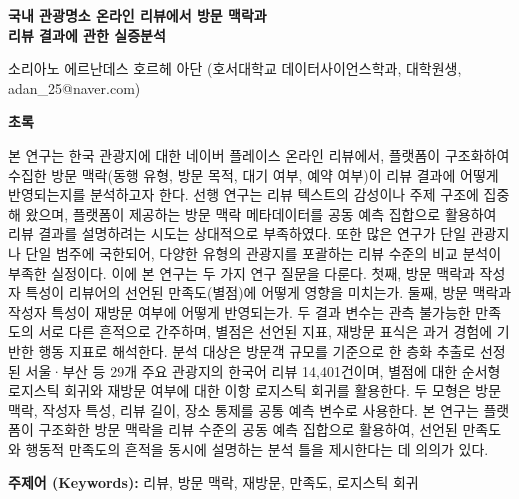 \documentclass[10pt,a4paper]{article}
\begin{document}
\begin{center}
{\Large\textbf{국내 관광명소 온라인 리뷰에서 방문 맥락과\\[2pt]
리뷰 결과에 관한 실증분석}}

\vspace{12pt}

{\normalsize *소리아노 에르난데스 호르헤 아단 (호서대학교 데이터사이언스학과,
대학원생, adan\_25@naver.com)}

\end{center}

\vspace{10pt}

\noindent\textbf{\large 초록}

\vspace{4pt}

\noindent
본 연구는 한국 관광지에 대한 네이버 플레이스 온라인 리뷰에서, 플랫폼이 구조화하여
수집한 방문 맥락(동행 유형, 방문 목적, 대기 여부, 예약 여부)이 리뷰 결과에 어떻게
반영되는지를 분석하고자 한다. 선행 연구는 리뷰 텍스트의 감성이나 주제 구조에
집중해 왔으며, 플랫폼이 제공하는 방문 맥락 메타데이터를 공동 예측 집합으로 활용하여
리뷰 결과를 설명하려는 시도는 상대적으로 부족하였다. 또한 많은 연구가 단일 관광지나
단일 범주에 국한되어, 다양한 유형의 관광지를 포괄하는 리뷰 수준의 비교 분석이
부족한 실정이다. 이에 본 연구는 두 가지 연구 질문을 다룬다. 첫째, 방문 맥락과
작성자 특성이 리뷰어의 선언된 만족도(별점)에 어떻게 영향을 미치는가. 둘째, 방문
맥락과 작성자 특성이 재방문 여부에 어떻게 반영되는가. 두 결과 변수는 관측 불가능한
만족도의 서로 다른 흔적으로 간주하며, 별점은 선언된 지표, 재방문 표식은 과거
경험에 기반한 행동 지표로 해석한다. 분석 대상은 방문객 규모를 기준으로 한 층화 추출로 선정된 서울·부산 등 29개 주요
관광지의 한국어 리뷰 14{,}401건이며, 별점에 대한 순서형 로지스틱 회귀와 재방문
여부에 대한 이항 로지스틱 회귀를 활용한다. 두 모형은 방문 맥락, 작성자 특성, 리뷰
길이, 장소 통제를 공통 예측 변수로 사용한다. 본 연구는 플랫폼이 구조화한 방문
맥락을 리뷰 수준의 공동 예측 집합으로 활용하여, 선언된 만족도와 행동적 만족도의
흔적을 동시에 설명하는 분석 틀을 제시한다는 데 의의가 있다.

\vspace{6pt}

\noindent\textbf{주제어 (Keywords):} 리뷰, 방문 맥락, 재방문, 만족도,
로지스틱 회귀
\end{document}
